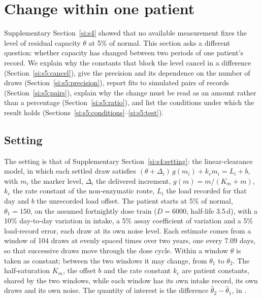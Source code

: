 \section{Change within one patient}
\label{si:s5}

Supplementary Section~\ref{si:s4} showed that no available measurement fixes the level of
residual capacity $\theta$ at 5\% of normal. This section asks a different question: whether
capacity has changed between two periods of one patient's record. We explain why the constants
that block the level cancel in a difference (Section~\ref{si:s5:cancel}), give the precision and
its dependence on the number of draws (Section~\ref{si:s5:precision}), report fits to simulated
pairs of records (Section~\ref{si:s5:pairs}), explain why the change must be read as an amount
rather than a percentage (Section~\ref{si:s5:ratio}), and list the conditions under which the
result holds (Sections~\ref{si:s5:conditions}--\ref{si:s5:test}).

\subsection{Setting}
\label{si:s5:setting}

The setting is that of Supplementary Section~\ref{si:s4:setting}: the linear-clearance model, in
which each settled draw satisfies
$(\theta+\Delta_i)\,g(m_i)+k_e m_i=L_i+b$, with $m_i$ the marker level, $\Delta_i$ the delivered
increment, $g(m)=m/(K_m+m)$, $k_e$ the rate constant of the non-enzymatic route, $L_i$ the load
recorded for that day and $b$ the unrecorded load offset. The patient starts at 5\% of normal,
$\theta_1=150$\um, on the assumed fortnightly dose train ($D=6000$\um, half-life 3.5\,d), with a
10\% day-to-day variation in intake, a 5\% assay coefficient of variation and a 5\% load-record
error, each draw at its own noise level. Each estimate comes from a window of 104 draws at
evenly spaced times over two years, one every 7.09 days, so that successive draws move through
the dose cycle. Within a window $\theta$ is taken as constant; between the two windows it may
change, from $\theta_1$ to $\theta_2$. The half-saturation $K_m$, the offset $b$ and the rate
constant $k_e$ are patient constants, shared by the two windows, while each window has its own
intake record, its own draws and its own noise. The quantity of interest is the difference
$\hat\theta_2-\hat\theta_1$, in \um.

